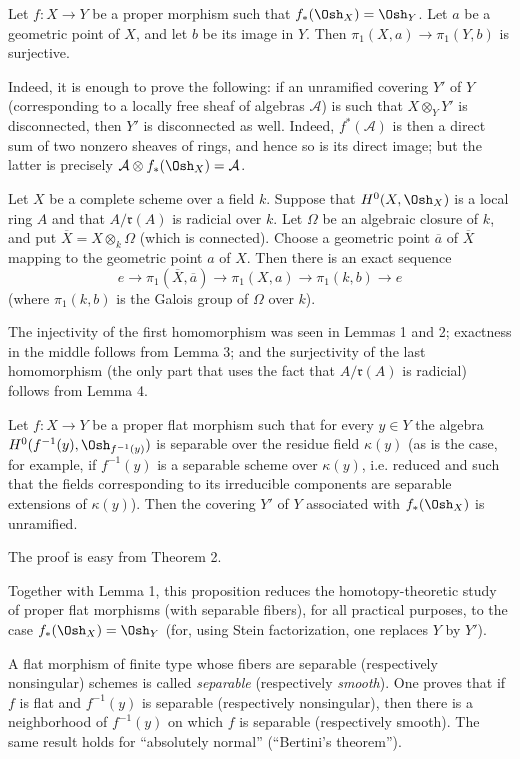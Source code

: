  Let $f:X\longrightarrow Y$ be a proper morphism such that
$f_*(\Osh_X)=\Osh_Y$. Let $a$ be a geometric point of $X$, and let $b$ be its
image in $Y$. Then $\pi_1(X,a)\longrightarrow\pi_1(Y,b)$ is surjective.

Indeed, it is enough to prove the following: if an unramified covering $Y'$ of
$Y$ (corresponding to a locally free sheaf of algebras $\mathcal A$) is such
that $X\otimes_Y Y'$ is disconnected, then $Y'$ is disconnected as well.
Indeed, $f^*(\mathcal A)$ is then a direct sum of two nonzero sheaves of rings,
and hence so is its direct image; but the latter is precisely
$\mathcal A\otimes f_*(\Osh_X)=\mathcal A$.

 Let $X$ be a complete scheme over a field $k$. Suppose that
$H^0(X,\Osh_X)$ is a local ring $A$ and that $A/\mathfrak r(A)$ is radicial
over $k$. Let $\Omega$ be an algebraic closure of $k$, and put
$\overline X=X\otimes_k\Omega$ (which is connected). Choose a geometric point
$\overline a$ of $\overline X$ mapping to the geometric point $a$ of $X$.
Then there is an exact sequence
\[
  e\longrightarrow\pi_1(\overline X,\overline a)
  \longrightarrow\pi_1(X,a)
  \longrightarrow\pi_1(k,b)\longrightarrow e
\]
(where $\pi_1(k,b)$ is the Galois group of $\Omega$ over $k$).

The injectivity of the first homomorphism was seen in Lemmas 1 and 2;
exactness in the middle follows from Lemma 3; and the surjectivity of the last
homomorphism (the only part that uses the fact that $A/\mathfrak r(A)$ is
radicial) follows from Lemma 4.

 Let $f:X\longrightarrow Y$ be a proper flat morphism
such that for every $y\in Y$ the algebra
$H^0(f^{-1}(y),\Osh_{f^{-1}(y)})$ is separable over the residue field
$\kappa(y)$ (as is the case, for example, if $f^{-1}(y)$ is a separable scheme
over $\kappa(y)$, i.e. reduced and such that the fields corresponding to its
irreducible components are separable extensions of $\kappa(y)$). Then the
covering
$Y'$ of $Y$ associated with $f_*(\Osh_X)$ is unramified.

The proof is easy from Theorem 2.

Together with Lemma 1, this proposition reduces the homotopy-theoretic study
of proper flat morphisms (with separable fibers), for all practical purposes,
to the case $f_*(\Osh_X)=\Osh_Y$ (for, using Stein factorization, one replaces
$Y$ by $Y'$).

 A flat morphism of finite type whose fibers are separable
(respectively nonsingular) schemes is called \emph{separable} (respectively
\emph{smooth}). One proves that if $f$ is flat and $f^{-1}(y)$ is separable
(respectively nonsingular), then there is a neighborhood of $f^{-1}(y)$ on
which $f$ is separable (respectively smooth). The same result holds for
“absolutely normal” (“Bertini's theorem”).

